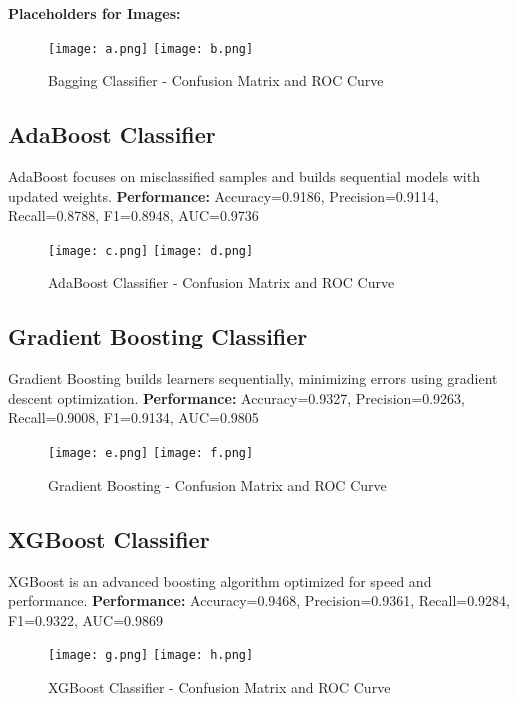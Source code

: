 \documentclass[12pt]{article}
\begin{document}
\textbf{Placeholders for Images:}  
\begin{figure}[h!]
\centering
\texttt{[image: a.png]}
\texttt{[image: b.png]}
\caption{Bagging Classifier - Confusion Matrix and ROC Curve}
\end{figure}

\subsection{AdaBoost Classifier}
AdaBoost focuses on misclassified samples and builds sequential models with updated weights.  
\newline
\textbf{Performance:}  
Accuracy=0.9186, Precision=0.9114, Recall=0.8788, F1=0.8948, AUC=0.9736  

\begin{figure}[h!]
\centering
\texttt{[image: c.png]}
\texttt{[image: d.png]}
\caption{AdaBoost Classifier - Confusion Matrix and ROC Curve}
\end{figure}

\subsection{Gradient Boosting Classifier}
Gradient Boosting builds learners sequentially, minimizing errors using gradient descent optimization.  
\newline
\textbf{Performance:}  
Accuracy=0.9327, Precision=0.9263, Recall=0.9008, F1=0.9134, AUC=0.9805  

\begin{figure}[h!]
\centering
\texttt{[image: e.png]}
\texttt{[image: f.png]}
\caption{Gradient Boosting - Confusion Matrix and ROC Curve}
\end{figure}

\subsection{XGBoost Classifier}
XGBoost is an advanced boosting algorithm optimized for speed and performance.  
\newline
\textbf{Performance:}  
Accuracy=0.9468, Precision=0.9361, Recall=0.9284, F1=0.9322, AUC=0.9869  

\begin{figure}[h!]
\centering
\texttt{[image: g.png]}
\texttt{[image: h.png]}
\caption{XGBoost Classifier - Confusion Matrix and ROC Curve}
\end{figure}
\end{document}
